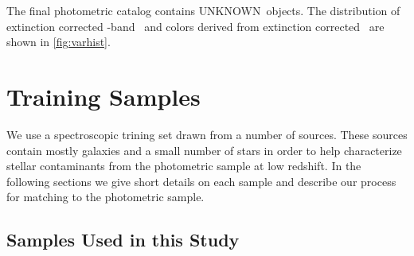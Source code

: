 \documentclass[preprint]{aastex}
\newcommand{\nphoto}{{\color{red} UNKNOWN}}
\begin{document}
The final photometric catalog contains \nphoto\ objects.  The distribution of
extinction corrected \rmag-band \cmodelmag\ and colors derived from extinction
corrected \modelmag\ are shown in \ref{fig:varhist}.

\section{Training Samples} \label{sec:train}

We use a spectroscopic trining set drawn from a number of sources. These
sources contain mostly galaxies and a small number of stars in order to help
characterize stellar contaminants from the photometric sample at low redshift.
In the following sections we give short details on each sample and describe our
process for matching to the photometric sample.

\subsection{Samples Used in this Study} \label{sec:train:def}
\end{document}
